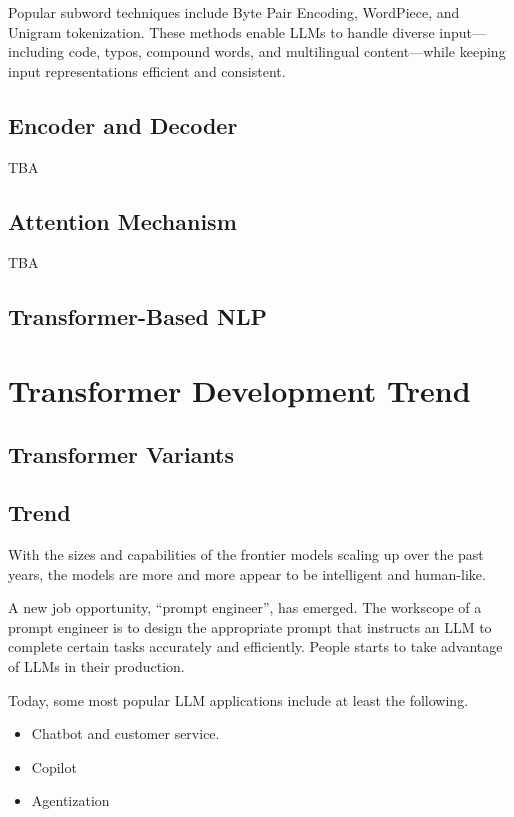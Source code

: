 Popular subword techniques include Byte Pair Encoding, WordPiece, and Unigram tokenization. These methods enable LLMs to handle diverse input—including code, typos, compound words, and multilingual content—while keeping input representations efficient and consistent.

\subsection{Encoder and Decoder}

TBA

\subsection{Attention Mechanism}

TBA

\subsection{Transformer-Based NLP}

\section{Transformer Development Trend}

\subsection{Transformer Variants}

\subsection{Trend}

With the sizes and capabilities of the frontier models scaling up over the past years, the models are more and more appear to be intelligent and human-like. 

A new job opportunity, ``prompt engineer'', has emerged. The workscope of a prompt engineer is to design the appropriate prompt that instructs an LLM to complete certain tasks accurately and efficiently. People starts to take advantage of LLMs in their production. 

Today, some most popular LLM applications include at least the following.
\begin{itemize}
  \item Chatbot and customer service.
  \item Copilot
  \item Agentization
\end{itemize}